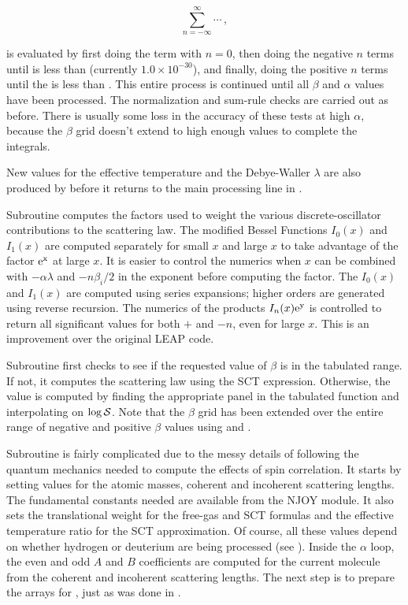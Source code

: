 \begin{equation}
   \sum_{n=-\infty}^{\infty} \cdots \,,
\end{equation}
\vspace{0.5 pt}

\noindent
is evaluated by first doing the term with $n{=}0$, then doing the
negative $n$ terms until  is less than 
(currently $1.0\times 10^{-30}$), and finally, doing the positive
$n$ terms until the  is less than .  This entire
process is continued until all $\beta$ and $\alpha$ values have been
processed.  The normalization and sum-rule checks are carried out as
before.  There is usually some loss in the accuracy of these tests at
high $\alpha$, because the $\beta$ grid doesn't extend to high enough
values to complete the integrals.

New values for the effective temperature and the Debye-Waller
$\lambda$ are also produced by  before it returns
to the main processing line in .

Subroutine 
computes the factors used to weight the various
discrete-oscillator contributions to the scattering law.  The modified
Bessel Functions $I_0(x)$ and $I_1(x)$ are computed separately for
small $x$ and large $x$ to take advantage of the factor $\rm e^{x}$ at
large $x$.  It is easier to control the numerics when $x$ can be
combined with $-\alpha\lambda$ and $-n\beta_i/2$ in the exponent before
computing the factor.  The $I_0(x)$ and $I_1(x)$ are computed using
series expansions; higher orders are generated using reverse
recursion\cite{recipes}.  The numerics of the products $I_n(x)\rm e^{y}$
is controlled to return all significant values for both $+$ and $-n$,
even for large $x$.  This is an improvement over the original LEAP code.

Subroutine 
first checks to see if the requested value of $\beta$
is in the tabulated range.  If not, it computes the scattering
law using the SCT expression.  Otherwise, the value is computed by
finding the appropriate panel in the tabulated function and
interpolating on $\log{\cal S}$.  Note that the $\beta$ grid has
been extended over the entire range of negative and positive $\beta$
values using  and .

Subroutine 
is fairly complicated due to the messy details
of following the quantum mechanics needed to compute the effects of
spin correlation.  It starts by setting values for the atomic masses,
coherent and incoherent scattering lengths.  The fundamental constants
needed are available from the NJOY
 module.  It also
sets the translational weight for the free-gas and SCT formulas and
the effective temperature ratio  for the SCT approximation.
Of course, all these values depend on whether hydrogen or deuterium are
being processed (see ).  Inside the $\alpha$ loop, the even
and odd $A$ and $B$ coefficients are computed for the current molecule
from the coherent and incoherent scattering lengths.  The next step is
to prepare the arrays for , just as was done in .

